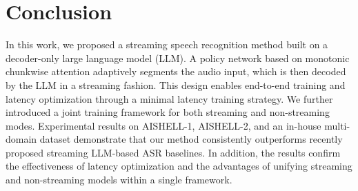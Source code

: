 \documentclass{article}
\begin{document}
\section{Conclusion}

In this work, we proposed a streaming speech recognition method built on a decoder-only large language model (LLM). A policy network based on monotonic chunkwise attention adaptively segments the audio input, which is then decoded by the LLM in a streaming fashion. This design enables end-to-end training and latency optimization through a minimal latency training strategy.
We further introduced a joint training framework for both streaming and non-streaming modes. Experimental results on AISHELL-1, AISHELL-2, and an in-house multi-domain dataset demonstrate that our method consistently outperforms recently proposed streaming LLM-based ASR baselines. In addition, the results confirm the effectiveness of latency optimization and the advantages of unifying streaming and non-streaming models within a single framework.


\vfill\pagebreak







\end{document}
